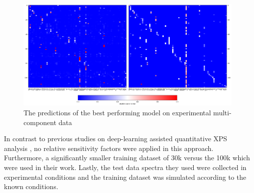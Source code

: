 \begin{figure}
    \centerline{
    \centering
    \includegraphics[width=1.5\textwidth]{Figures/cnn_dct_mae_32F_multi_best_model_pred.png}}
    \caption{The predictions of the best performing model on experimental multi-component data}
    \label{fig:multi_best_model}
\end{figure}

In contrast to previous studies on deep-learning assisted quantitative XPS analysis \cite{drera_deep_2019}, no relative sensitivity factors were applied in this approach. Furthermore, a significantly smaller training dataset of 30k versus the 100k which were used in their work. Lastly, the test data spectra they used were collected in experimental conditions and the training dataset was simulated according to the known conditions.

